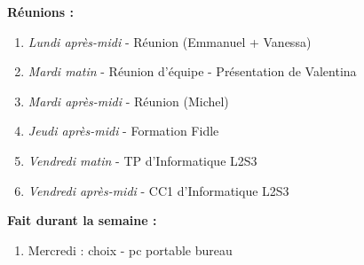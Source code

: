 \textbf{Réunions :}
\begin{enumerate}[label=\textbullet]
	\item \textit{Lundi après-midi} - Réunion (Emmanuel + Vanessa)
	\item \textit{Mardi matin} - Réunion d'équipe - Présentation de Valentina
	\item \textit{Mardi après-midi} - Réunion (Michel)
	\item \textit{Jeudi après-midi} - Formation Fidle
	\item \textit{Vendredi matin} - TP d'Informatique L2S3
	\item \textit{Vendredi après-midi} - CC1 d'Informatique L2S3
\end{enumerate}
\textbf{Fait durant la semaine :}
\begin{enumerate}[label=\textbullet]
	\item Mercredi : choix - pc portable bureau 
\end{enumerate}
